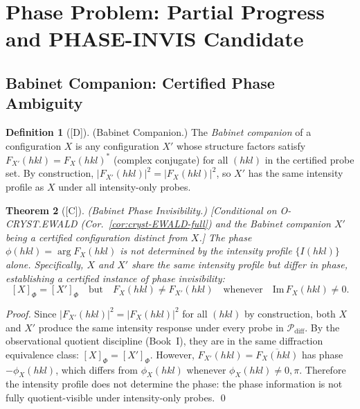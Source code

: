 \documentclass[12pt,oneside]{amsbook}
\theoremstyle{plain}
\newtheorem{theorem}{Theorem}[section]
\theoremstyle{definition}
\newtheorem{definition}[theorem]{Definition}
\theoremstyle{remark}
\newcommand{\status}[1]{\textup{[#1]}}
\begin{document}
\section{Phase Problem: Partial Progress and PHASE-INVIS Candidate}
\label{sec:cryst-phase-progress}

\subsection{Babinet Companion: Certified Phase Ambiguity}

\begin{definition}[\status{D}]\label{def:cryst-babinet}
\textup{(Babinet Companion.)}
The \emph{Babinet companion} of a configuration $X$ is any
configuration $X'$ whose structure factors satisfy
$F_{X'}(hkl) = F_X(hkl)^*$ (complex conjugate) for all
$(hkl)$ in the certified probe set.  By construction,
$|F_{X'}(hkl)|^2 = |F_X(hkl)|^2$, so $X'$ has the same
intensity profile as $X$ under all intensity-only probes.
\end{definition}

\begin{theorem}[\status{C}]\label{thm:cryst-babinet-invis}
\textup{(Babinet Phase Invisibility.)}
\textup{[Conditional on O-CRYST.EWALD (Cor.~\ref{cor:cryst-EWALD-full})
and the Babinet companion $X'$ being a certified configuration distinct
from $X$.]}
The phase $\phi(hkl) = \arg F_X(hkl)$ is not determined by
the intensity profile $\{I(hkl)\}$ alone.  Specifically,
$X$ and $X'$ share the same intensity profile but differ in
phase, establishing a certified instance of phase
invisibility:
\[
  [X]_{\Phi} = [X']_{\Phi}
  \quad\text{but}\quad
  F_X(hkl) \ne F_{X'}(hkl)
  \quad\text{whenever}\quad
  \mathrm{Im}\,F_X(hkl) \ne 0.
\]
\end{theorem}

\begin{proof}
Since $|F_{X'}(hkl)|^2 = |F_X(hkl)|^2$ for all $(hkl)$
by construction, both $X$ and $X'$ produce the same intensity
response under every probe in $\mathcal{P}_{\mathrm{diff}}$.
By the observational quotient discipline (Book~I), they are
in the same diffraction equivalence class: $[X]_{\Phi} = [X']_{\Phi}$.
However, $F_{X'}(hkl) = \overline{F_X(hkl)}$ has phase
$-\phi_{X}(hkl)$, which differs from $\phi_X(hkl)$ whenever
$\phi_X(hkl) \ne 0, \pi$.  Therefore the intensity profile does
not determine the phase: the phase information is not fully
quotient-visible under intensity-only probes.
\qed
\end{proof}
\end{document}
